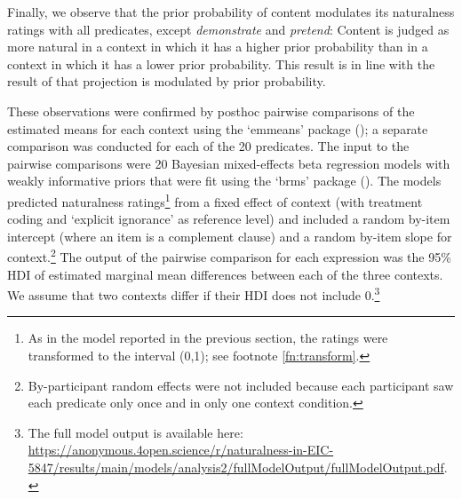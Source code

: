 \documentclass[11pt,fleqn]{article}
\newcommand{\6}{\mbox{$[\hspace*{-.6mm}[$}}
\newcommand{\9}{\mbox{$]\hspace*{-.6mm}]$}}
\begin{document}
Finally, we observe that the prior probability of content modulates its naturalness ratings with all predicates, except {\em demonstrate} and {\em pretend}: Content is judged as more natural in a context in which it has a higher prior probability than in a context in which it has a lower prior probability. This result is in line with the result of \citealt{degen-tonhauser-openmind} that projection is modulated by prior probability.

These observations were confirmed by posthoc pairwise comparisons of the estimated means for each context using the `emmeans' package (\citealt{emmeans}); a separate comparison was conducted for each of the 20 predicates. The input to the pairwise comparisons were 20 Bayesian mixed-effects beta regression models with weakly informative priors that were fit using the `brms' package (\citealt{buerkner2017}). The models predicted  naturalness ratings\footnote{As in the model reported in the previous section, the ratings were transformed to the interval (0,1); see footnote \ref{fn:transform}.} from a fixed effect of context (with treatment coding and `explicit ignorance' as reference level) and included a random by-item intercept (where an item is a complement clause) and a random by-item slope for context.\footnote{By-participant random effects were not included because each participant saw each predicate only once and in only one context condition.} The output of the pairwise comparison for each expression was the 95\% HDI of estimated marginal mean differences between each of the three contexts. We assume that two contexts differ if their HDI does not include 0.\footnote{The full model output is available here: \url{https://anonymous.4open.science/r/naturalness-in-EIC-5847/results/main/models/analysis2/fullModelOutput/fullModelOutput.pdf}.} 
\end{document}
